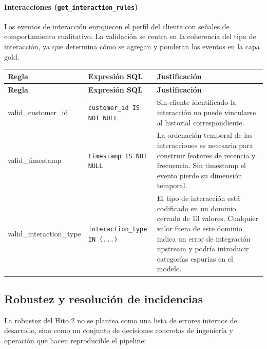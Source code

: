 \documentclass[12pt,a4paper]{article}
\begin{document}
\paragraph{Interacciones (\texttt{get\_interaction\_rules})}

Los eventos de interacción enriquecen el perfil del cliente con señales de comportamiento cualitativo. La validación se centra en la coherencia del tipo de interacción, ya que determina cómo se agregan y ponderan los eventos en la capa gold.

\begin{longtable}{>{\ttfamily}p{4.2cm} p{5.5cm} p{5.5cm}}
\toprule
\textbf{Regla} & \textbf{Expresión SQL} & \textbf{Justificación} \\
\midrule
\endfirsthead
\toprule
\textbf{Regla} & \textbf{Expresión SQL} & \textbf{Justificación} \\
\midrule
\endhead
\bottomrule
\endlastfoot
valid\_customer\_id & \texttt{customer\_id IS NOT NULL} & Sin cliente identificado la interacción no puede vincularse al historial correspondiente. \\[4pt]
valid\_timestamp & \texttt{timestamp IS NOT NULL} & La ordenación temporal de las interacciones es necesaria para construir features de recencia y frecuencia. Sin timestamp el evento pierde su dimensión temporal. \\[4pt]
valid\_interaction\_type & \texttt{interaction\_type IN (...)} & El tipo de interacción está codificado en un dominio cerrado de 13 valores. Cualquier valor fuera de este dominio indica un error de integración upstream y podría introducir categorías espurias en el modelo. \\
\end{longtable}

\subsection{Robustez y resolución de incidencias}

La robustez del Hito 2 no se plantea como una lista de errores internos de desarrollo, sino como un conjunto de decisiones concretas de ingeniería y operación que hacen reproducible el pipeline:
\end{document}
